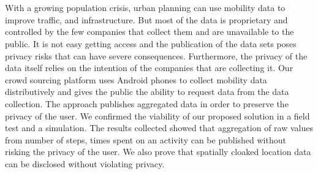 \chapter{\abstractname}
With a growing population crisis, urban planning can use mobility data to improve traffic, and infrastructure. But  most of the data is proprietary and controlled by the few companies that collect them and are unavailable to the public. It is not easy getting access and the publication of the data sets poses privacy risks that can have severe consequences. Furthermore, the privacy of the data itself relies on the intention of the companies that are collecting it. Our crowd sourcing platform uses Android phones to collect mobility data distributively and gives the public the ability to request data from the data collection. The approach publishes aggregated data in order to preserve the privacy of the user. We confirmed the viability of our proposed solution in a field test and a simulation. The results collected showed that aggregation of raw values from number of steps, times spent on an activity can be published without risking the privacy of the user. We also prove that spatially cloaked location data can be disclosed without violating privacy.